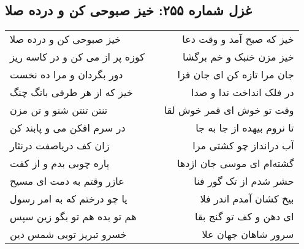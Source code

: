 \begin{center}
\section*{غزل شماره ۲۵۵: خیز صبوحی کن و درده صلا}
\label{sec:0255}
\begin{longtable}{l p{0.5cm} r}
خیز صبوحی کن و درده صلا
&&
خیز که صبح آمد و وقت دعا
\\
کوزه پر از می کن و در کاسه ریز
&&
خیز مزن خنبک و خم برگشا
\\
دور بگردان و مرا ده نخست
&&
جان مرا تازه کن ای جان فزا
\\
خیز که از هر طرفی بانگ چنگ
&&
در فلک انداخت ندا و صدا
\\
تنتن تنتن شنو و تن مزن
&&
وقت تو خوش ای قمر خوش لقا
\\
در سرم افکن می و پابند کن
&&
تا نروم بیهده از جا به جا
\\
زان کف دریاصفت درنثار
&&
آب درانداز چو کشتی مرا
\\
پاره چوبی بدم و از کفت
&&
گشته‌ام ای موسی جان اژدها
\\
عازر وقتم به دمت ای مسیح
&&
حشر شدم از تک گور فنا
\\
یا چو درختم که به امر رسول
&&
بیخ کشان آمدم اندر فلا
\\
هم تو بده هم تو بگو زین سپس
&&
ای دهن و کف تو گنج بقا
\\
خسرو تبریز تویی شمس دین
&&
سرور شاهان جهان علا
\\
\end{longtable}
\end{center}
